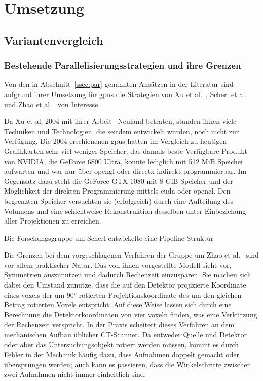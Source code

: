 \chapter{Umsetzung}

\section{Variantenvergleich}

\subsection{Bestehende Parallelisierungsstrategien und ihre Grenzen}

Von den in Abschnitt~\ref{ssec:par} genannten Ansätzen in der Literatur sind aufgrund ihrer Umsetzung für \gls{gpu}s die
Strategien von Xu et al.~\cite{xumuell}, Scherl et al.~\cite{scherlkeck} und Zhao et al.~\cite{zhao} von Interesse.

Da Xu et al. 2004 mit ihrer Arbeit~\cite{xumuell} Neuland betraten, standen ihnen viele Techniken und Technologien, die
seitdem entwickelt wurden, noch nicht zur Verfügung. Die 2004 erschienenen \gls{gpu}s hatten im Vergleich zu heutigen
Grafikkarten sehr viel weniger Speicher; das damals beste Verfügbare Produkt von NVIDIA{\textregistered}, die GeForce
6800 Ultra, konnte lediglich mit 512 MiB Speicher aufwarten und war nur über \gls{opengl} oder \gls{directx} indirekt
programmierbar. Im Gegensatz dazu steht die GeForce GTX 1080 mit 8 GiB Speicher und der Möglichkeit der direkten
Programmierung mittels \gls{cuda} oder \gls{opencl}. Den begrenzten Speicher versuchten sie (erfolgreich) durch eine
Aufteilung des Volumens und eine schichtweise Rekonstruktion desselben unter Einbeziehung aller Projektionen zu
erreichen.

Die Forschungsgruppe um Scherl entwickelte eine Pipeline-Struktur

Die Grenzen bei dem vorgeschlagenen Verfahren der Gruppe um Zhao et al.~\cite{zhao} sind vor allem praktischer Natur.
Das von ihnen vorgestellte Modell sieht vor, Symmetrien auszunutzen und dadurch Rechenzeit einzusparen. Sie machen sich
dabei den Umstand zunutze, dass die auf den Detektor projizierte Koordinate eines \gls{voxel}s der um 90° rotierten
Projektionskoordinate des um den gleichen Betrag rotierten Voxels entspricht. Auf diese Weise lassen sich durch eine
Berechnung die Detektorkoordinaten von vier \gls{voxel}n finden, was eine Verkürzung der Rechenzeit verspricht. In der
Praxis scheitert dieses Verfahren an dem mechanischen Aufbau üblicher CT-Scanner. Da entweder Quelle und Detektor oder
aber das Untersuchungsobjekt rotiert werden müssen, kommt es durch Fehler in der Mechanik häufig dazu, dass Aufnahmen
doppelt gemacht oder übersprungen werden; auch kann es passieren, dass die Winkelschritte zwischen zwei Aufnahmen nicht
immer einheitlich sind.

